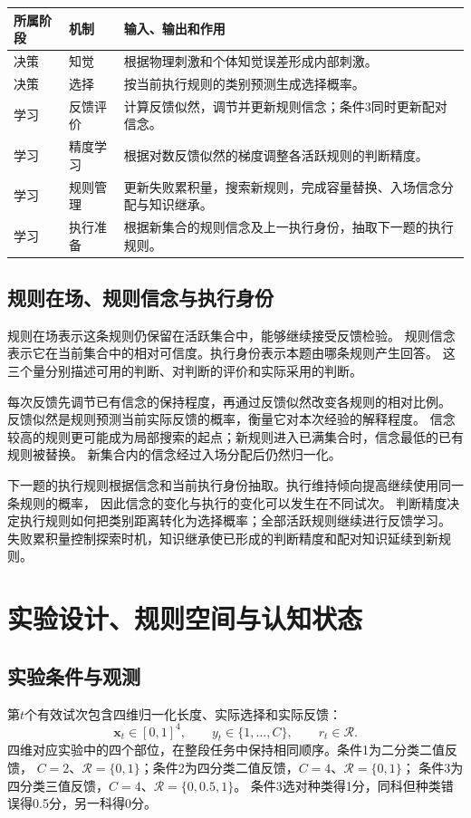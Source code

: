 \documentclass[11pt,a4paper]{article}
\numberwithin{equation}{section}
\newcommand{\Rr}{\mathcal{R}}
\begin{document}
{\small\noindent
\begin{tabularx}{\linewidth}{L{2.5cm}L{3.3cm}Y}
\toprule
所属阶段 & 机制 & 输入、输出和作用\\
\midrule
决策 & 知觉 & 根据物理刺激和个体知觉误差形成内部刺激。\\
决策 & 选择 & 按当前执行规则的类别预测生成选择概率。\\
学习 & 反馈评价 & 计算反馈似然，调节并更新规则信念；条件3同时更新配对信念。\\
学习 & 精度学习 & 根据对数反馈似然的梯度调整各活跃规则的判断精度。\\
学习 & 规则管理 & 更新失败累积量，搜索新规则，完成容量替换、入场信念分配与知识继承。\\
学习 & 执行准备 & 根据新集合的规则信念及上一执行身份，抽取下一题的执行规则。\\
\bottomrule
\end{tabularx}}


\subsection{规则在场、规则信念与执行身份}
规则在场表示这条规则仍保留在活跃集合中，能够继续接受反馈检验。
规则信念表示它在当前集合中的相对可信度。执行身份表示本题由哪条规则产生回答。
这三个量分别描述可用的判断、对判断的评价和实际采用的判断。

每次反馈先调节已有信念的保持程度，再通过反馈似然改变各规则的相对比例。
反馈似然是规则预测当前实际反馈的概率，衡量它对本次经验的解释程度。
信念较高的规则更可能成为局部搜索的起点；新规则进入已满集合时，信念最低的已有规则被替换。
新集合内的信念经过入场分配后仍然归一化。

下一题的执行规则根据信念和当前执行身份抽取。执行维持倾向提高继续使用同一条规则的概率，
因此信念的变化与执行的变化可以发生在不同试次。
判断精度决定执行规则如何把类别距离转化为选择概率；全部活跃规则继续进行反馈学习。
失败累积量控制探索时机，知识继承使已形成的判断精度和配对知识延续到新规则。

\section{实验设计、规则空间与认知状态}
\label{sec:state}

\subsection{实验条件与观测}
第$t$个有效试次包含四维归一化长度、实际选择和实际反馈：
\begin{equation}
\bm x_t\in[0,1]^4,\qquad y_t\in\{1,\ldots,C\},\qquad r_t\in\Rr.
\end{equation}
四维对应实验中的四个部位，在整段任务中保持相同顺序。条件1为二分类二值反馈，
$C=2$、$\Rr=\{0,1\}$；条件2为四分类二值反馈，$C=4$、$\Rr=\{0,1\}$；
条件3为四分类三值反馈，$C=4$、$\Rr=\{0,0.5,1\}$。
条件3选对种类得1分，同科但种类错误得0.5分，另一科得0分。
\end{document}
